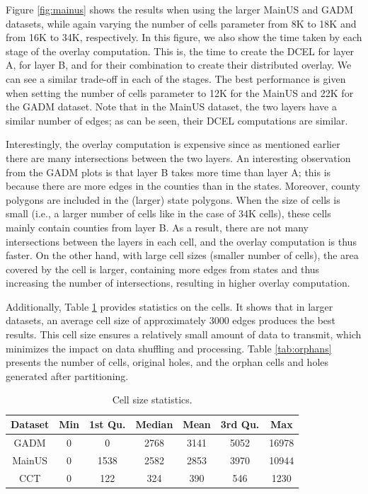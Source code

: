 Figure \ref{fig:mainus} shows the results when using the larger MainUS and GADM datasets, while again varying the number of cells parameter from 8K to 18K and from 16K to 34K, respectively. In this figure, we also show the time taken by each stage of the overlay computation.  This is, the time to create the DCEL for layer A, for layer B, and for their combination to create their distributed overlay. We can see a similar trade-off in each of the stages. The best performance is given when setting the number of cells parameter to 12K for the MainUS and 22K for the GADM dataset. Note that in the MainUS dataset, the two layers have a similar number of edges; as can be seen, their DCEL computations are similar.

Interestingly, the overlay computation is expensive since as mentioned earlier there are many intersections between the two layers. An interesting observation from the GADM plots is that layer B takes more time than layer A; this is because there are more edges in the counties than in the states. Moreover, county polygons are included in the (larger) state polygons. When the size of cells is small (i.e., a larger number of cells like in the case of 34K cells), these cells mainly contain counties from layer B. As a result, there are not many intersections between the layers in each cell, and the overlay computation is thus faster. On the other hand, with large cell sizes (smaller number of cells), the area covered by the cell is larger, containing more edges from states and thus increasing the number of intersections, resulting in higher overlay computation.

Additionally, Table \ref{tab:cell_stats} provides statistics on the cells. It shows that in larger datasets, an average cell size of approximately 3000 edges produces the best results. This cell size ensures a relatively small amount of data to transmit, which minimizes the impact on data shuffling and processing.  Table \ref{tab:orphans} presents the number of cells, original holes, and the orphan cells and holes generated after partitioning.

\begin{table}
    \centering
    \small
    \caption{Cell size statistics.}\label{tab:cell_stats}
    \begin{tabular}{ccccccc}
        \toprule
        Dataset & Min & 1st Qu. & Median & Mean & 3rd Qu. & Max   \\
        \midrule
        GADM    & 0   & 0       & 2768   & 3141 & 5052    & 16978 \\
        MainUS  & 0   & 1538    & 2582   & 2853 & 3970    & 10944 \\
        CCT     & 0   & 122     & 324    & 390  & 546     & 1230  \\
        \bottomrule
    \end{tabular}
\end{table}


